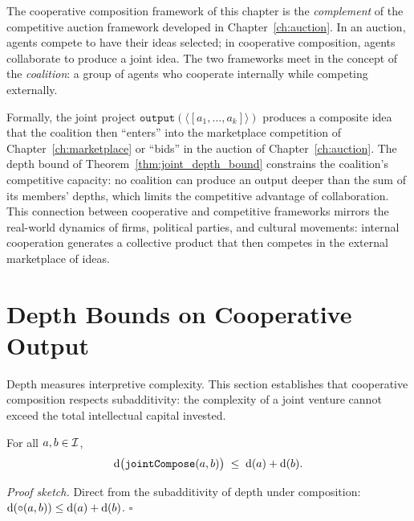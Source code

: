 \begin{remark}
\label{rem:auction-connection}
The cooperative composition framework of this chapter is the
\emph{complement} of the competitive auction framework developed in
Chapter~\ref{ch:auction}.  In an auction, agents compete to have their
ideas selected; in cooperative composition, agents collaborate to
produce a joint idea.  The two frameworks meet in the concept of the
\emph{coalition}: a group of agents who cooperate internally while
competing externally.

Formally, the joint project $\texttt{output}(\langle [a_1, \ldots,
a_k] \rangle)$ produces a composite idea that the coalition then
``enters'' into the marketplace competition of
Chapter~\ref{ch:marketplace} or ``bids'' in the auction of
Chapter~\ref{ch:auction}.  The depth bound of
Theorem~\ref{thm:joint_depth_bound} constrains the coalition's
competitive capacity: no coalition can produce an output deeper than
the sum of its members' depths, which limits the competitive advantage
of collaboration.  This connection between cooperative and competitive
frameworks mirrors the real-world dynamics of firms, political parties,
and cultural movements: internal cooperation generates a collective
product that then competes in the external marketplace of ideas.
\end{remark}

\section{Depth Bounds on Cooperative Output}
\label{sec:ch16-depth}

Depth measures interpretive complexity.  This section establishes that
cooperative composition respects subadditivity: the complexity of a joint
venture cannot exceed the total intellectual capital invested.

\begin{theorem}
\label{thm:joint_depth_bound}
For all $a, b \in \mathcal{I}$,
\[
  \operatorname{d}\bigl(\texttt{jointCompose}(a, b)\bigr) \;\leq\;
  \operatorname{d}(a) + \operatorname{d}(b).
\]
\end{theorem}

\noindent\textit{Proof sketch.}\quad
Direct from the subadditivity of depth under composition:
$\operatorname{d}(\circ(a,b)) \leq \operatorname{d}(a) + \operatorname{d}(b)$.
\hfill$\square$

\medskip


